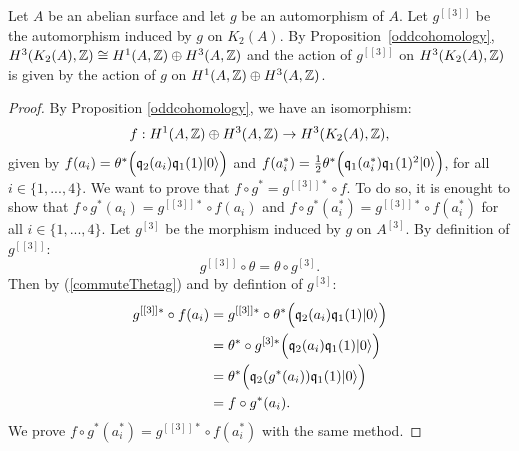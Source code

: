 \begin{cor}\label{actionH3}
Let $A$ be an abelian surface and let $g$ be an automorphism of $A$. Let $g^{[[3]]}$ be the automorphism induced by $g$ on $K_2(A)$.
By Proposition~\ref{oddcohomology}, $H^3(K_2(A),\mathbb{Z})\cong H^1(A,\mathbb{Z})\oplus H^3(A,\mathbb{Z})$ and the action of $g^{[[3]]}$ on $H^3(K_2(A),\mathbb{Z})$ is given by the action of $g$ on $H^1(A,\mathbb{Z})\oplus H^3(A,\mathbb{Z})$.
\end{cor}
\begin{proof}
By Proposition \ref{oddcohomology}, we have an isomorphism:
$$f:H^1(A,\mathbb{Z})\oplus H^3(A,\mathbb{Z})\rightarrow H^3(K_2(A),\mathbb{Z}),$$
given by $f(a_i)=\theta^*\Big(\mathfrak{q}_2(a_i)\mathfrak{q}_1(1)|0\rangle\Big)$ and $f(a_i^*)=\frac{1}{2}\theta^*\Big( \mathfrak{q}_1(a^*_i)\mathfrak{q}_1(1)^2|0\rangle \Big)$, for all $i\in\{1,...,4\}$.
We want to prove that $f\circ g^*=g^{[[3]]*}\circ f$. 
To do so, it is enought to show that $f\circ g^*(a_i)=g^{[[3]]*}\circ f(a_i)$ and $f\circ g^*(a_i^*)=g^{[[3]]*}\circ f(a_i^*)$ for all $i\in\{1,...,4\}$.
Let $g^{[3]}$ be the morphism induced by $g$ on $A^{[3]}$. By definition of $g^{[[3]]}$:
\begin{equation}
g^{[[3]]}\circ \theta=\theta\circ g^{[3]}.
\label{commuteThetag}
\end{equation}
Then by (\ref{commuteThetag}) and by defintion of $g^{[3]}$:
\begin{align*}
 g^{[[3]]*}\circ f(a_i)&=g^{[[3]]*}\circ\theta^*\Big(\mathfrak{q}_2(a_i)\mathfrak{q}_1(1)|0\rangle\Big)\\
 &=\theta^*\circ g^{[3]*}\Big(\mathfrak{q}_2(a_i)\mathfrak{q}_1(1)|0\rangle\Big)\\
 &=\theta^*\Big(\mathfrak{q}_2(g^*(a_i))\mathfrak{q}_1(1)|0\rangle\Big)\\
 &=f\circ g^*(a_i).
\end{align*}
We prove $f\circ g^*(a_i^*)=g^{[[3]]*}\circ f(a_i^*)$ with the same method.


\end{proof}

